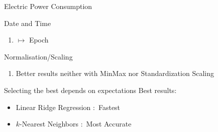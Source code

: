 \begin{frame}{Electric Power Consumption}


\begin{tcolorbox}[colback=LightSteelBlue!5,colframe=yellow!40!black,title=Facts]

\bi
\mi Date and Time 
\begin{enumerate}
    \item $\mapsto$ Epoch
  \end{enumerate}
  
  \mi Normalisation/Scaling 
\begin{enumerate}
    \item Better results neither with MinMax nor Standardization Scaling 
  \end{enumerate}
 
\mi Selecting the best depends on expectations
  \mi Best results:
  \begin{itemize}
    \item Linear Ridge Regression $:$ Fastest
    \item $k$-Nearest Neighbors $:$ Most Accurate
  \end{itemize}
\ei


\end{tcolorbox}

\end{frame}
